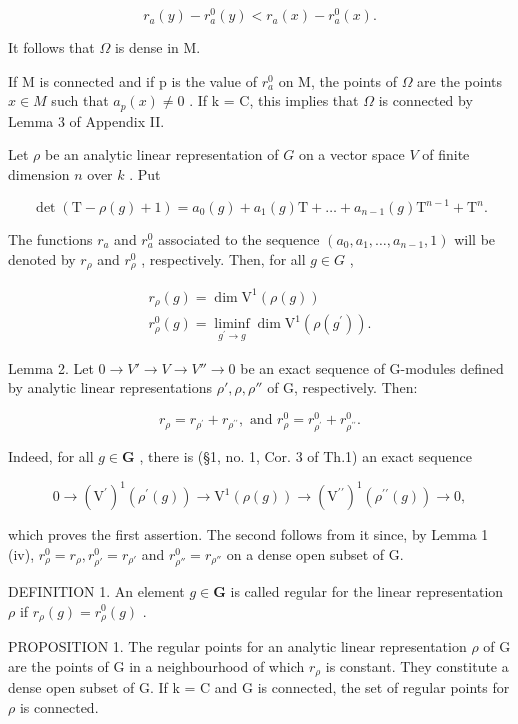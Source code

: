 \[
r _ {a} (y) - r _ {a} ^ {0} (y) <   r _ {a} (x) - r _ {a} ^ {0} (x).
\]

It follows that \(\Omega\) is dense in M.

If M is connected and if p is the value of \(r_{a}^{0}\) on M, the points of \(\Omega\) are the points \(x \in M\) such that \(a_{p}(x) \neq 0\) . If k = C, this implies that \(\Omega\) is connected by Lemma 3 of Appendix II.

Let \(\rho\) be an analytic linear representation of \(G\) on a vector space \(V\) of finite dimension \(n\) over \(k\) . Put

\[
\det (\mathrm{T} - \rho (g) + 1) = a _ {0} (g) + a _ {1} (g) \mathrm{T} + \dots + a _ {n - 1} (g) \mathrm{T} ^ {n - 1} + \mathrm{T} ^ {n}.
\]

The functions \(r_a\) and \(r_a^0\) associated to the sequence \((a_0, a_1, \ldots, a_{n-1}, 1)\) will be denoted by \(r_\rho\) and \(r_\rho^0\) , respectively. Then, for all \(g \in G\) ,

\[
\begin{array}{l} r _ {\rho} (g) = \dim \mathrm{V} ^ {1} (\rho (g)) \\ r _ {\rho} ^ {0} (g) = \liminf _ {g ^ {\prime} \to g} \dim \mathrm{V} ^ {1} (\rho (g ^ {\prime})). \end{array}
\]

Lemma 2. Let \(0 \to V' \to V \to V'' \to 0\) be an exact sequence of G-modules defined by analytic linear representations \(\rho', \rho, \rho''\) of G, respectively. Then:

\[
r _ {\rho} = r _ {\rho^ {\prime}} + r _ {\rho^ {\prime \prime}}, \text { and } r _ {\rho} ^ {0} = r _ {\rho^ {\prime}} ^ {0} + r _ {\rho^ {\prime \prime}} ^ {0}.
\]

Indeed, for all \(g \in \mathbf{G}\) , there is (§1, no. 1, Cor. 3 of Th.1) an exact sequence

\[
0 \to (\mathrm{V} ^ {\prime}) ^ {1} (\rho^ {\prime} (g)) \to \mathrm{V} ^ {1} (\rho (g)) \to (\mathrm{V} ^ {\prime \prime}) ^ {1} (\rho^ {\prime \prime} (g)) \to 0,
\]

which proves the first assertion. The second follows from it since, by Lemma 1 (iv), \(r_{\rho}^{0} = r_{\rho}, r_{\rho'}^{0} = r_{\rho'}\) and \(r_{\rho''}^{0} = r_{\rho''}\) on a dense open subset of G.

DEFINITION 1. An element \(g \in \mathbf{G}\) is called regular for the linear representation \(\rho\) if \(r_{\rho}(g) = r_{\rho}^{0}(g)\) .

PROPOSITION 1. The regular points for an analytic linear representation \(\rho\) of G are the points of G in a neighbourhood of which \(r_{\rho}\) is constant. They constitute a dense open subset of G. If k = C and G is connected, the set of regular points for \(\rho\) is connected.

